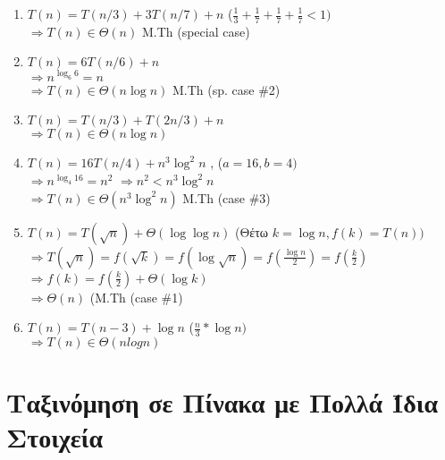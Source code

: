 \documentclass[a4paper,10pt]{article} \usepackage{anysize}
\newcommand{\tab}{\hspace*{3em}}
\begin{document}
\begin{enumerate}
\begin{enumerate}
\item $T(n) = T(n/3) +3T(n/7)+n$
\tab ($\frac{1}{3}+\frac{1}{7}+\frac{1}{7}+\frac{1}{7}< 1)$\\
$\Rightarrow T(n) \in \Theta(n)$ \tab M.Th (special case) \\

\item $T(n) = 6T(n/6)+n$\\
$\Rightarrow n^{\log _6 {6}} = n$\\
$\Rightarrow T(n) \in \Theta(n\log {n})$ \tab M.Th (sp. case \#2)\\

\item $T(n) = T(n/3) + T(2n/3) + n$\\
$\Rightarrow T(n) \in \Theta(n\log{n})$\\

\item $T(n) = 16T(n/4) + n^3\log^2{n}$ , \tab ($a=16, b=4)$\\
$\Rightarrow n^{\log _4{16}} = n^2$
$\Rightarrow n^2 < n^3\log^2{n}$\\
$\Rightarrow T(n) \in \Theta(n^3\log^2{n})$ \tab M.Th (case \#3)\\

\item $T(n) = T(\sqrt{n}) + \Theta(\log{\log{n}})$ \tab
(Θέτω $k=\log{n}, f(k)=T(n))$\\
$\Rightarrow
T(\sqrt{n})=f(\sqrt{k})=f(\log{\sqrt{n}})=f(\frac{\log{n}}{2})=f(\frac{k}{2}) $\\
$\Rightarrow f(k)=f(\frac{k}{2})+\Theta(\log{k})$\\
$\Rightarrow \Theta(n)$ \tab (M.Th (case \#1)\\

\item $T(n) = T(n-3) + \log{n}$ \tab ($\frac{n}{3} * \log{n})$ \\
$\Rightarrow T(n) \in \Theta(nlogn)$

\end{enumerate}
\end{enumerate}
\pagebreak

\section{Ταξινόμηση σε Πίνακα με Πολλά Ίδια Στοιχεία}
\end{document}
